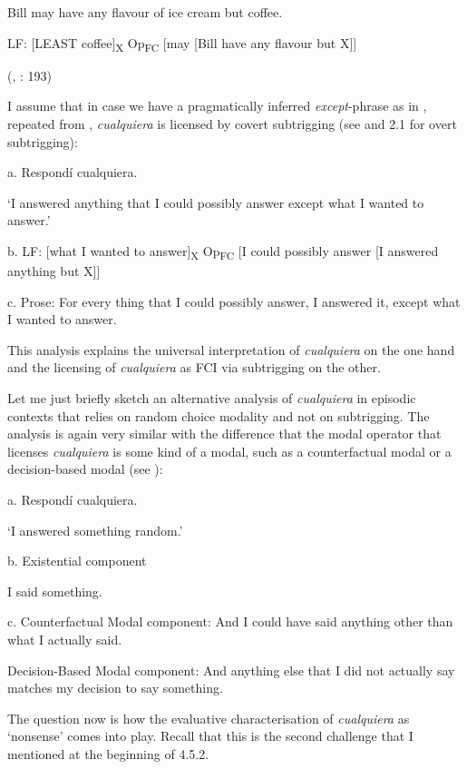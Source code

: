     Bill may have any flavour of ice cream but coffee.

    LF: [LEAST coffee]\textsubscript{X} Op\textsubscript{FC} [may [Bill have any flavour but X]]

    (\citealt{Gajewski2008}, \citealt{Gajewski2013}: 193)

I assume that in case we have a pragmatically inferred \textit{except}{}-phrase as in  , repeated from , \textit{cualquiera} is licensed by covert subtrigging (see \citealt{Quer2000} and 2.1 for overt subtrigging):

\label{bkm:Ref63461661}  a.  Respondí cualquiera.

‘I answered anything that I could possibly answer except what I wanted to answer.’

  b.  LF: [what I wanted to answer]\textsubscript{X} Op\textsubscript{FC} [I could possibly answer [I answered anything but X]] 

  c.  Prose: For every thing that I could possibly answer, I answered it, except what I wanted to answer.

This analysis explains the universal interpretation of \textit{cualquiera} on the one hand and the licensing of \textit{cualquiera} as FCI via subtrigging on the other.

  Let me just briefly sketch an alternative analysis of \textit{cualquiera} in episodic contexts that relies on random choice modality and not on subtrigging. The analysis is again very similar with the difference that the modal operator that licenses \textit{cualquiera} is some kind of a modal, such as a counterfactual modal or a decision-based modal (see ):

\label{bkm:Ref150787301}  a.  Respondí cualquiera. 

‘I answered something random.’

  b.  Existential component

I said something.

  c.  Counterfactual Modal component: And I could have said anything other than what I actually said.

Decision-Based Modal component: And anything else that I did not actually say matches my decision to say something.

The question now is how the evaluative characterisation of \textit{cualquiera} as ‘nonsense’ comes into play. Recall that this is the second challenge that I mentioned at the beginning of 4.5.2. 

